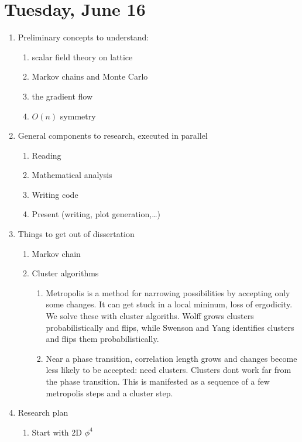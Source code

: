 \documentclass[english]{article}
\begin{document}
\section{Tuesday, June 16}
\begin{enumerate}
        
    \item Preliminary concepts to understand: 
        \begin{enumerate}
            \item scalar field theory on lattice
            \item Markov chains and Monte Carlo
            \item the gradient flow
            \item $O(n)$ symmetry
        \end{enumerate}

    \item General components to research, executed in parallel
        \begin{enumerate}    
            \item Reading
            \item Mathematical analysis
            \item Writing code
            \item Present (writing, plot generation,\dots)
        \end{enumerate}

    \item Things to get out of dissertation \cite{Schaich2006}
        \begin{enumerate}
            \item Markov chain
            \item Cluster algorithms

            \begin{enumerate}
                \item Metropolis is a method for narrowing possibilities by accepting only some changes. It can get stuck in a local mininum, loss of ergodicity. We solve these with cluster algoriths. Wolff grows clusters probabilistically and flips, while Swenson and Yang identifies clusters and flips them probabilistically.

                \item Near a phase transition, correlation length grows and changes become less likely to be accepted: need clusters. Clusters dont work far from the phase transition. This is manifested as a sequence of a few metropolis steps and a cluster step.
            \end{enumerate}
        \end{enumerate}
    \item Research plan
        \begin{enumerate}
            \item Start with 2D $\phi^4$


\end{enumerate}
\end{enumerate}
\end{document}
